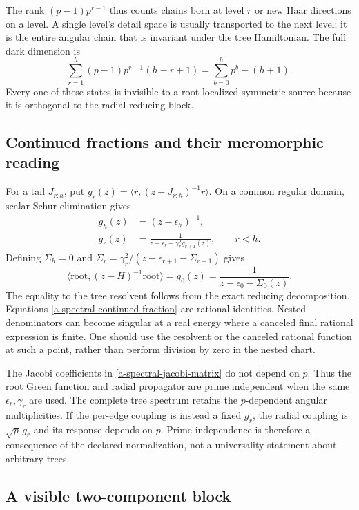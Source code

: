 The rank $(p-1)p^{r-1}$ thus counts chains born at level $r$ or
new Haar directions on a level. A single level's detail space is
usually transported to the next level; it is the entire angular
chain that is invariant under the tree Hamiltonian. The full dark
dimension is
\[
 \sum_{r=1}^h(p-1)p^{r-1}(h-r+1)
 =\sum_{b=0}^hp^b-(h+1).
\]
Every one of these states is invisible to a root-localized symmetric
source because it is orthogonal to the radial reducing block.

\subsection{Continued fractions and their meromorphic reading}

For a tail $J_{r:h}$, put
$g_r(z)=\langle r,(z-J_{r:h})^{-1}r\rangle$. On a common regular
domain, scalar Schur elimination gives
\begin{align}
 g_h(z)&=(z-\epsilon_h)^{-1},\nonumber\\
 g_r(z)&=\frac1{z-\epsilon_r-\gamma_r^2g_{r+1}(z)},
          \qquad r<h.
 \label{a-spectral-continued-fraction}
\end{align}
Defining $\Sigma_h=0$ and
$\Sigma_r=\gamma_r^2/(z-\epsilon_{r+1}-\Sigma_{r+1})$ gives
\begin{equation}
 \langle\mathrm{root},(z-H)^{-1}\mathrm{root}\rangle
   =g_0(z)=\frac1{z-\epsilon_0-\Sigma_0(z)}.
 \label{a-spectral-root-green}
\end{equation}
The equality to the tree resolvent follows from the exact reducing
decomposition. Equations \eqref{a-spectral-continued-fraction} are
rational identities. Nested denominators can become singular at a
real energy where a canceled final rational expression is finite.
One should use the resolvent or the canceled rational function at
such a point, rather than perform division by zero in the nested chart.

The Jacobi coefficients in \eqref{a-spectral-jacobi-matrix} do not
depend on $p$. Thus the root Green function and radial propagator
are prime independent when the same $\epsilon_r,\gamma_r$ are used.
The complete tree spectrum retains the $p$-dependent angular
multiplicities. If the per-edge coupling is instead a fixed $g_r$,
the radial coupling is $\sqrt p\,g_r$ and its response depends on $p$.
Prime independence is therefore a consequence of the declared
normalization, not a universality statement about arbitrary trees.

\subsection{A visible two-component block}

